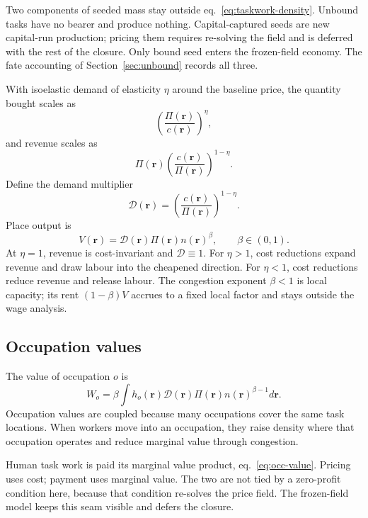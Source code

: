 \documentclass[12pt, a4paper]{article}
\begin{document}
Two components of seeded mass stay outside
eq.~\eqref{eq:taskwork-density}. Unbound tasks have no bearer and
produce nothing. Capital-captured seeds are new capital-run production;
pricing them requires re-solving the field and is deferred with the rest
of the closure. Only bound seed enters the frozen-field economy. The
fate accounting of Section~\ref{sec:unbound} records all three.

With isoelastic demand of elasticity $\eta$ around the baseline price,
the quantity bought scales as
\[
  \left(\frac{\Pi(\mathbf{r})}{c(\mathbf{r})}\right)^\eta,
\]
and revenue scales as
\[
  \Pi(\mathbf{r})
  \left(
    \frac{c(\mathbf{r})}{\Pi(\mathbf{r})}
  \right)^{1-\eta}.
\]
Define the demand multiplier
\begin{equation}
  \mathcal{D}(\mathbf{r})
  =
  \left(
    \frac{c(\mathbf{r})}{\Pi(\mathbf{r})}
  \right)^{1-\eta}.
  \label{eq:demand-multiplier}
\end{equation}
Place output is
\begin{equation}
  V(\mathbf{r})
  =
  \mathcal{D}(\mathbf{r})
  \Pi(\mathbf{r})
  n(\mathbf{r})^\beta,
  \qquad \beta\in(0,1).
  \label{eq:place-output}
\end{equation}
At $\eta=1$, revenue is cost-invariant and $\mathcal{D}\equiv1$. For
$\eta>1$, cost reductions expand revenue and draw labour into the
cheapened direction. For $\eta<1$, cost reductions reduce revenue and
release labour. The congestion exponent $\beta<1$ is local capacity;
its rent $(1-\beta)V$ accrues to a fixed local factor and stays outside
the wage analysis.

\subsection{Occupation values}
\label{sec:occupation-values}

The value of occupation $o$ is
\begin{equation}
  W_o
  =
  \beta
  \int
  h_o(\mathbf{r})
  \mathcal{D}(\mathbf{r})
  \Pi(\mathbf{r})
  n(\mathbf{r})^{\beta-1}
  d\mathbf{r}.
  \label{eq:occ-value}
\end{equation}
Occupation values are coupled because many occupations cover the same
task locations. When workers move into an occupation, they raise density
where that occupation operates and reduce marginal value through
congestion.

Human task work is paid its marginal value product,
eq.~\eqref{eq:occ-value}. Pricing uses cost; payment uses marginal
value. The two are not tied by a zero-profit condition here, because
that condition re-solves the price field. The frozen-field model keeps
this seam visible and defers the closure.
\end{document}
